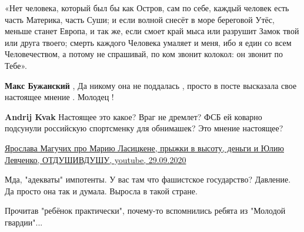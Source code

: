 \begin{itemize}
«Нет человека, который был бы как Остров, сам по себе, каждый человек есть
часть Материка, часть Суши; и если волной снесёт в море береговой Утёс, меньше
станет Европа, и так же, если смоет край мыса или разрушит Замок твой или друга
твоего; смерть каждого Человека умаляет и меня, ибо я един со всем
Человечеством, а потому не спрашивай, по ком звонит колокол: он звонит по
Тебе».


 
\textbf{Макс Бужанский} , Да никому она не поддалась , просто в посте высказала свое настоящее мнение . Молодец !

\begin{itemize}
 
\textbf{Andrij Kvak} Настоящее это какое? Враг не дремлет? ФСБ ей коварно подсунули российскую спортсменку для обнимашек? Это мнение настоящее?
\end{itemize}

\href{https://www.youtube.com/watch?v=tNSr6NmhRG4}{%
Ярослава Магучих про Марию Ласицкене, прыжки в высоту, деньги и Юлию Левченко, %
ОТДУШИВДУШУ, youtube, 29.09.2020%
}

 
Мда, "адекваты" импотенты. У вас там что фашистское государство? Давление. Да просто она так и думала. Выросла в такой стране.

 
Прочитав "ребёнок практически", почему-то вспомнились ребята из "Молодой гвардии"...

 

\end{itemize}
